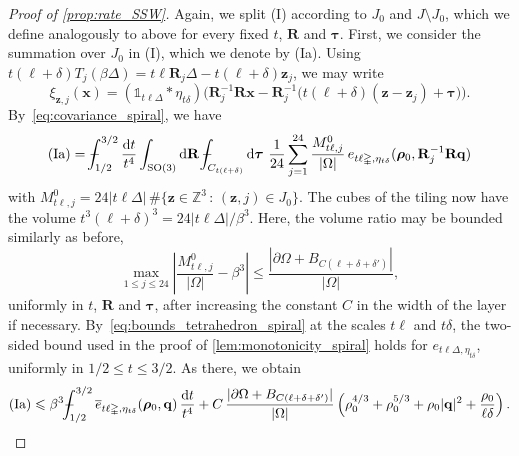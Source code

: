 \documentclass[final,reqno]{amsart}
\theoremstyle{remark}
\renewcommand{\le}{\leqslant}
\newcommand{\ol}[1]{\overline{#1}}
\newcommand{\ZZ}{\mathbb{Z}}
\newcommand{\SO}{\mathrm{SO}}
\newcommand{\iden}{\mathbb{1}}
\newcommand{\tetra}{\mathbb{\Delta}}
\newcommand{\dd}{\mathrm{d}}
\def\Xint#1{\mathchoice
{\XXint\displaystyle\textstyle{#1}}
{\XXint\textstyle\scriptstyle{#1}}
{\XXint\scriptstyle\scriptscriptstyle{#1}}
{\XXint\scriptscriptstyle\scriptscriptstyle{#1}}
\!\int}
\def\XXint#1#2#3{{\setbox0=\hbox{$#1{#2#3}{\int}$ }
\vcenter{\hbox{$#2#3$ }}\kern-.6\wd0}}
\def\dashint{\Xint-}
\begin{document}
\begin{proof}[Proof of \cref{prop:rate_SSW}]
Again, we split (I) according to $J_0$ and $J\setminus J_0$, which we define analogously to above for every fixed $t$, $\mathbf{R}$ and $\bm{\tau}$. First, we consider the summation over $J_0$ in (I), which we denote by (Ia). Using $t(\ell+\delta)T_j(\beta\tetra)=t\ell\mathbf{R}_j\tetra-t(\ell+\delta)\mathbf{z}_j$, we may write
\[
 \xi_{\mathbf{z},j}(\mathbf{x})
 =(\iden_{t\ell\tetra}\ast\eta_{t\delta})\Big(\mathbf{R}_j^{-1}\mathbf{R}\mathbf{x}-\mathbf{R}_j^{-1}\big(t(\ell+\delta)(\mathbf{z}-\mathbf{z}_j)+\bm{\tau}\big)\Big).
\]
By~\cref{eq:covariance_spiral}, we have
\[
 \mathrm{(Ia)}=\dashint_{1/2}^{3/2}\frac{\dd t}{t^4}\int_{\SO(3)}\dd\mathbf{R}\,\dashint_{C_{t(\ell+\delta)}}\dd\bm{\tau}\
 \frac1{24}\sum_{j=1}^{24}\frac{M^0_{t\ell,j}}{|\Omega|}\,
 e_{t\ell\tetra,\eta_{t\delta}}(\bm{\rho}_0,\mathbf{R}_j^{-1}\mathbf{R}\mathbf{q})
\]
with $M^0_{t\ell,j}=24|t\ell\tetra|\,\#\{\mathbf{z}\in\ZZ^3\,:\,(\mathbf{z},j)\in J_0\}$. The cubes of the tiling now have the volume $t^3(\ell+\delta)^3=24|t\ell\tetra|/\beta^3$. Here, the volume ratio may be bounded similarly as before,
\[
 \max_{1\le j\le24}\left|\frac{M^0_{t\ell,j}}{|\Omega|}-\beta^3\right|\le\frac{|\partial\Omega+B_{C(\ell+\delta+\delta')}|}{|\Omega|},
\]
uniformly in $t$, $\mathbf{R}$ and $\bm{\tau}$, after increasing the constant $C$ in the width of the layer if necessary. By~\cref{eq:bounds_tetrahedron_spiral} at the scales $t\ell$ and $t\delta$, the two-sided bound used in the proof of \cref{lem:monotonicity_spiral} holds for $e_{t\ell\tetra,\eta_{t\delta}}$, uniformly in $1/2\le t\le3/2$. As there, we obtain
\[
 \mathrm{(Ia)}\le\beta^3\dashint_{1/2}^{3/2}\ol e_{t\ell\tetra,\eta_{t\delta}}(\bm{\rho}_0,\mathbf{q})\,\frac{\dd t}{t^4}+C\,\frac{|\partial\Omega+B_{C(\ell+\delta+\delta')}|}{|\Omega|}\left(\rho_0^{4/3}+\rho_0^{5/3}+\rho_0|\mathbf{q}|^2+\frac{\rho_0}{\ell\delta}\right).
\]


\end{proof}
\end{document}
